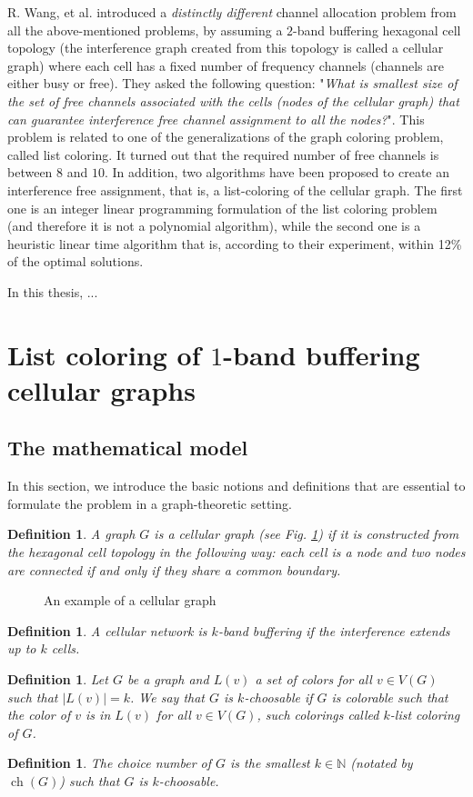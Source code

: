\documentclass[a4paper, 12pt]{article}
\newtheorem{defin}[lem]{Definition}
\DeclareMathOperator*{\ch}{ch}
\begin{document}
R. Wang, et al. \cite{7248845} introduced a \textit{distinctly different} channel allocation problem from all the above-mentioned problems, by assuming a $2$-band buffering hexagonal cell topology (the interference graph created from this topology is called a cellular graph) where each cell has a fixed number of frequency channels (channels are either busy or free). They asked the following question: "\textit{What is smallest size of the set of free channels associated with the cells (nodes of the cellular graph) that can guarantee interference free channel assignment to all the nodes?}". This problem is related to one of the generalizations of the graph coloring problem, called list coloring. It turned out that the required number of free channels is between $8$ and $10$. In addition, two algorithms have been proposed to create an interference free assignment, that is, a list-coloring of the cellular graph. The first one is an integer linear programming formulation of the list coloring problem (and therefore it is not a polynomial algorithm), while the second one is a heuristic linear time algorithm that is, according to their experiment, within 12\% of the optimal solutions.

In this thesis, ...
\newpage
\section{List coloring of $1$-band buffering cellular graphs} 
\subsection{The mathematical model}
In this section, we introduce the basic notions and definitions that are essential to formulate the problem in a graph-theoretic setting.
\begin{defin} A graph $G$ is a  \textit{cellular graph} (see Fig. \ref{fig:cellular-graph}) if it is constructed from the hexagonal cell topology in the following way: each cell is a node and two nodes are connected if and only if they share a common boundary.
\end{defin}
\begin{figure}[!h]
\centering
\caption{An example of a cellular graph}\label{fig:cellular-graph}
\end{figure}
\begin{defin} A cellular network is $k$\textit{-band buffering} if the interference extends up to $k$ cells.
\end{defin}
\begin{defin} Let $G$ be a graph and $L(v)$ a set of colors for all $v \in V(G)$ such that $|L(v)|=k$. We say that $G$ is $k$\textit{-choosable} if $G$ is colorable such that the color of $v$ is in $L(v)$ for all $v \in V(G)$, such colorings called $k$\textit{-list coloring} of $G$.
\end{defin}
\begin{defin} The \textit{choice number} of $G$ is the smallest $k \in \mathbb{N}$ (notated by $\ch(G)$) such that $G$ is $k$-choosable.
\end{defin}
\end{document}
